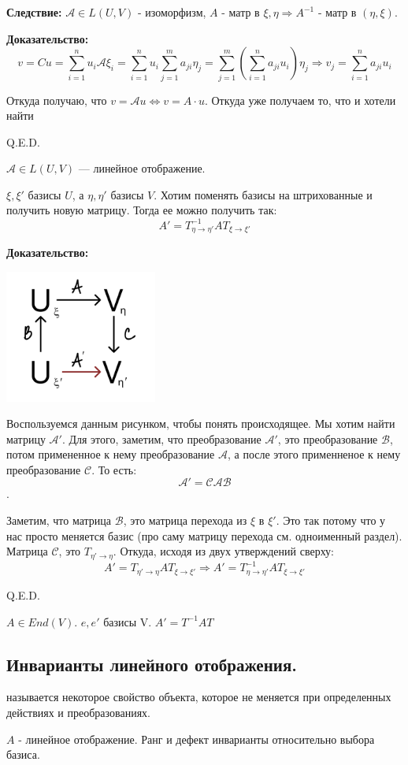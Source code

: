\textbf{Следствие:} $\mathcal{A} \in L(U,V)$ - изоморфизм, $A$ - матр в $\xi,\eta \Rightarrow A^{-1}$ - матр в $(\eta, \xi)$. 

\textbf{Доказательство:}
$$v = Cu = \sum\limits_{i=1}^n u_i \mathcal{A} \xi_i = \sum\limits_{i=1}^n u_i \sum\limits_{j=1}^ma_{ji} \eta_j = \sum\limits_{j=1}^m (\sum\limits_{i=1}^na_{ji}u_i)\eta_j  \Rightarrow v_j =\sum\limits_{i=1}^na_{ji}u_i$$

Откуда получаю, что $v = \mathcal{A} u \Leftrightarrow v = A \cdot u$. Откуда уже получаем то, что и хотели найти

\hfill Q.E.D.


$\mathcal{A} \in L(U,V)$ --- линейное отображение.

$\xi,\xi'$ базисы $U$, а $\eta, \eta'$ базисы $V$. Хотим поменять базисы на штрихованные и получить новую матрицу. Тогда ее можно получить так:
$$A' = T^{-1}_{\eta \rightarrow \eta'} A T_{\xi\rightarrow \xi'}$$

\textbf{Доказательство:}

\begin{center}
    \includegraphics[width = 5cm]{assets/7_2_1.png}
\end{center}
    Воспользуемся данным рисунком, чтобы понять происходящее. Мы хотим найти матрицу $\mathcal{A}'$. Для этого, заметим, что преобразование $\mathcal{A}'$, это преобразование $\mathcal{B}$, потом примененное к нему преобразование $\mathcal{A}$, а после этого применненое к нему преобразование $\mathcal{C}$. То есть:
    $$\mathcal{A}'=\mathcal{C}\mathcal{A}\mathcal{B}$$.

    Заметим, что матрица $\mathcal{B}$, это матрица перехода из $\xi$ в $\xi'$. Это так потому что у нас просто меняется базис (про саму матрицу перехода см. одноименный раздел). Матрица $\mathcal{C}$, это $T_{\eta' \rightarrow \eta}$. Откуда, исходя из двух утверждений сверху:
    $$A' = T_{\eta' \rightarrow \eta} A T_{\xi\rightarrow \xi'}\Rightarrow A' = T^{-1}_{\eta \rightarrow \eta'} A T_{\xi\rightarrow \xi'}$$ 

\hfill Q.E.D.

 $A \in End(V)$. $e,e'$ базисы V. $A' = T^{-1}AT$

\subsection{Инварианты линейного отображения.}

 называется некоторое свойство объекта, которое не меняется при определенных действиях и преобразованиях.

$A$ - линейное отображение. Ранг и дефект инварианты относительно выбора базиса.
    
